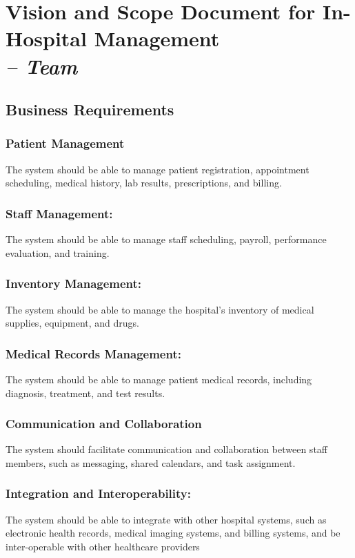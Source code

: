 \chapter{Vision and Scope Document for In-Hospital Management  \\
\small{\textit{-- Team}} 
\label{Chapter::Introduction}}

\section{Business Requirements\label{Section::Business Requirements}}
\subsection{Patient Management} The system should be able to manage patient registration, appointment scheduling, medical history, lab results, prescriptions, and billing.
\subsection{Staff Management: }The system should be able to manage staff scheduling, payroll, performance evaluation, and training.
\subsection{Inventory Management: } The system should be able to manage the hospital's inventory of medical supplies, equipment, and drugs.
\subsection{Medical Records Management:}  The system should be able to manage patient medical records, including diagnosis, treatment, and test results.
\subsection{Communication and Collaboration} The system should facilitate communication and collaboration between staff members, such as messaging, shared calendars, and task assignment.
\subsection{Integration and Interoperability:} The system should be able to integrate with other hospital systems, such as electronic health records, medical imaging systems, and billing systems, and be inter-operable with other healthcare providers
